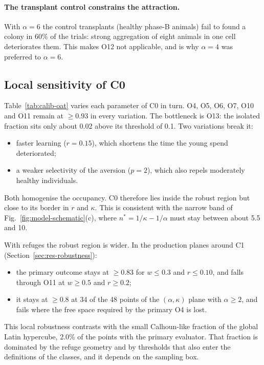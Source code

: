 \paragraph{The transplant control constrains the attraction.}
With $\alpha=6$ the control transplants (healthy phase-B animals) fail to found a colony in 60\% of the
trials: strong aggregation of eight animals in one cell deteriorates them. This makes O12 not applicable,
and is why $\alpha=4$ was preferred to $\alpha=6$.

\subsection{Local sensitivity of \textsf{C0}}
\label{sec:calib-sensitivity}

Table~\ref{tab:calib-oat} varies each parameter of \textsf{C0} in turn. O4, O5, O6, O7, O10 and O11 remain
at $\ge0.93$ in every variation. The bottleneck is O13: the isolated fraction sits only about 0.02 above
its threshold of 0.1. Two variations break it:
\begin{itemize}
  \item faster learning ($r=0.15$), which shortens the time the young spend deteriorated;
  \item a weaker selectivity of the aversion ($p=2$), which also repels moderately healthy individuals.
\end{itemize}
Both homogenise the occupancy. \textsf{C0} therefore lies inside the robust region but close to its
border in $r$ and $\kappa$. This is consistent with the narrow band of Fig.~\ref{fig:model-schematic}(c),
where $n^*=1/\kappa-1/\alpha$ must stay between about 5.5 and 10.

With refuges the robust region is wider. In the production planes around \textsf{C1}
(Section~\ref{sec:res-robustness}):
\begin{itemize}
  \item the primary outcome stays at $\ge0.83$ for $w\le0.3$ and $r\le0.10$, and falls through O11 at $w\ge0.5$
    and $r\ge0.2$;
  \item it stays at $\ge0.8$ at 34 of the 48 points of the $(\alpha,\kappa)$ plane with $\alpha\ge2$, and fails
    where the free space required by the primary O4 is lost.
\end{itemize}
This local robustness contrasts with the small Calhoun-like fraction of the global Latin hypercube, 2.0\% of the
points with the primary evaluator. That fraction is dominated by the refuge geometry and by thresholds that also
enter the definitions of the classes, and it depends on the sampling box.

